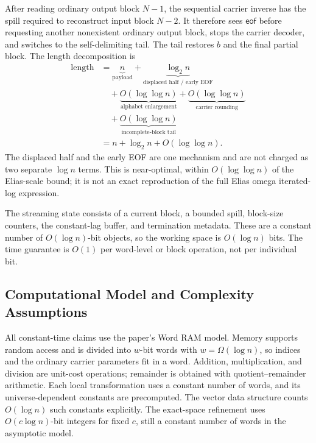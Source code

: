 After reading ordinary output block \(N-1\), the sequential carrier inverse
has the spill required to reconstruct input block \(N-2\).  It therefore sees
\(\mathsf{eof}\) before requesting another nonexistent ordinary output block,
stops the carrier decoder, and switches to the self-delimiting tail.  The tail
restores \(b\) and the final partial block.  The length decomposition is
\[
\begin{aligned}
    \text{length}
    &=\underbrace{n}_{\text{payload}}
      +\underbrace{\log_2n}_{\text{displaced half / early EOF}}\\
    &\quad+\underbrace{O(\log\log n)}_{\text{alphabet enlargement}}
      +\underbrace{O(\log\log n)}_{\text{carrier rounding}}\\
    &\quad+\underbrace{O(\log\log n)}_{\text{incomplete-block tail}}\\
    &=n+\log_2n+O(\log\log n).
\end{aligned}
\]
The displaced half and the early EOF are one mechanism and are not charged as
two separate \(\log n\) terms.  This is near-optimal, within
\(O(\log\log n)\) of the Elias-scale bound; it is not an exact reproduction
of the full Elias omega iterated-log expression.

The streaming state consists of a current block, a bounded spill, block-size
counters, the constant-lag buffer, and termination metadata.  These are a
constant number of \(O(\log n)\)-bit objects, so the working space is
\(O(\log n)\) bits.  The time guarantee is \(O(1)\) per word-level or block
operation, not per individual bit.

\subsection{Computational Model and Complexity Assumptions}

All constant-time claims use the paper's Word RAM model.  Memory supports
random access and is divided into \(w\)-bit words with
\(w=\Omega(\log n)\), so indices and the ordinary carrier parameters fit in
a word.  Addition, multiplication, and division are unit-cost operations;
remainder is obtained with quotient--remainder arithmetic.  Each local
transformation uses a constant number of words, and its universe-dependent
constants are precomputed.  The vector data structure counts
\(O(\log n)\) such constants explicitly.  The exact-space refinement uses
\(O(c\log n)\)-bit integers for fixed \(c\), still a constant number of
words in the asymptotic model.

